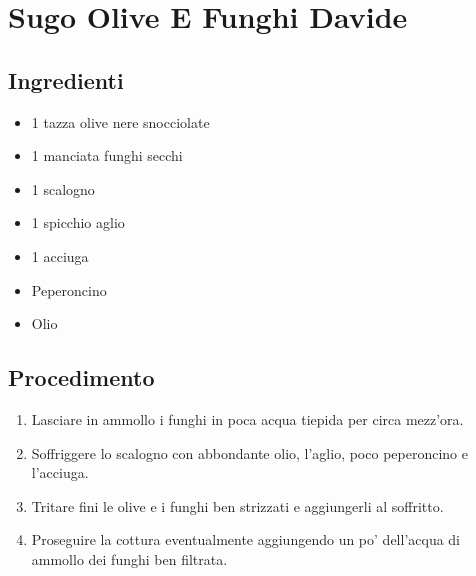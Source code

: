 \section{Sugo Olive E Funghi Davide}
\subsection{Ingredienti}
\begin{itemize}
\item 1 tazza olive nere snocciolate  
\item 1 manciata funghi secchi  
\item 1 scalogno  
\item 1 spicchio aglio  
\item 1 acciuga  
\item Peperoncino  
\item Olio
\end{itemize}
\subsection{Procedimento}
\begin{enumerate}
\item  Lasciare in ammollo i funghi in poca acqua tiepida per circa mezz'ora.  
\item  Soffriggere lo scalogno con abbondante olio, l'aglio, poco peperoncino e l'acciuga.  
\item  Tritare fini le olive e i funghi ben strizzati e aggiungerli al soffritto.   
\item  Proseguire la cottura eventualmente aggiungendo un po' dell'acqua di ammollo dei funghi ben filtrata.
\end{enumerate}
